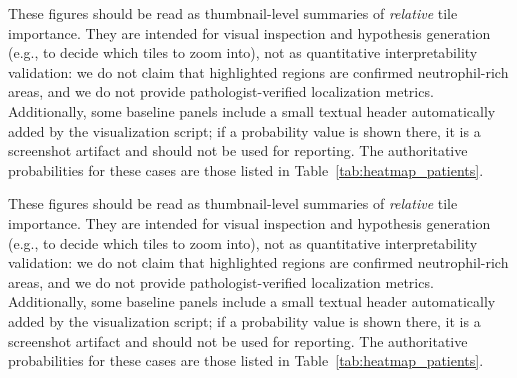 These figures should be read as thumbnail-level summaries of \emph{relative} tile importance. They are intended for visual inspection and hypothesis generation (e.g., to decide which tiles to zoom into), not as quantitative interpretability validation: we do not claim that highlighted regions are confirmed neutrophil-rich areas, and we do not provide pathologist-verified localization metrics. Additionally, some baseline panels include a small textual header automatically added by the visualization script; if a probability value is shown there, it is a screenshot artifact and should not be used for reporting. The authoritative probabilities for these cases are those listed in Table~\ref{tab:heatmap_patients}.

These figures should be read as thumbnail-level summaries of \emph{relative} tile importance. They are intended for visual inspection and hypothesis generation (e.g., to decide which tiles to zoom into), not as quantitative interpretability validation: we do not claim that highlighted regions are confirmed neutrophil-rich areas, and we do not provide pathologist-verified localization metrics. Additionally, some baseline panels include a small textual header automatically added by the visualization script; if a probability value is shown there, it is a screenshot artifact and should not be used for reporting. The authoritative probabilities for these cases are those listed in Table~\ref{tab:heatmap_patients}.

\begin{table}[H]
\centering
\caption{Illustrative HN cases used for paired heatmap visualization. Reported probabilities are slide-level outputs from each model family. Baseline probabilities are derived from the reference CSV.}
\label{tab:heatmap_patients}
\end{table}

